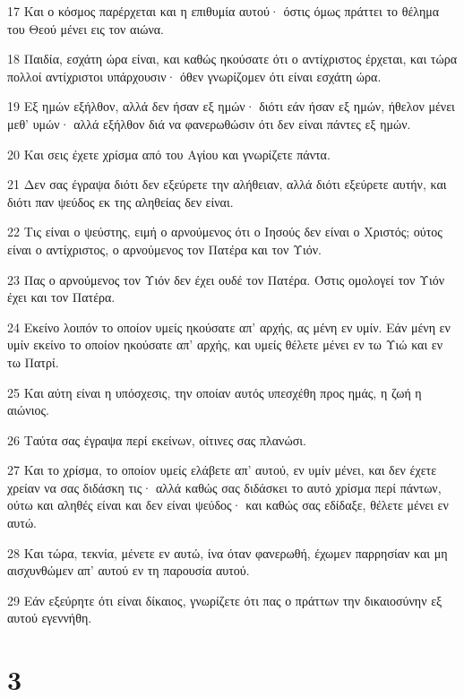 \par 17 Και ο κόσμος παρέρχεται και η επιθυμία αυτού· όστις όμως πράττει το θέλημα του Θεού μένει εις τον αιώνα.
\par 18 Παιδία, εσχάτη ώρα είναι, και καθώς ηκούσατε ότι ο αντίχριστος έρχεται, και τώρα πολλοί αντίχριστοι υπάρχουσιν· όθεν γνωρίζομεν ότι είναι εσχάτη ώρα.
\par 19 Εξ ημών εξήλθον, αλλά δεν ήσαν εξ ημών· διότι εάν ήσαν εξ ημών, ήθελον μένει μεθ' υμών· αλλά εξήλθον διά να φανερωθώσιν ότι δεν είναι πάντες εξ ημών.
\par 20 Και σεις έχετε χρίσμα από του Αγίου και γνωρίζετε πάντα.
\par 21 Δεν σας έγραψα διότι δεν εξεύρετε την αλήθειαν, αλλά διότι εξεύρετε αυτήν, και διότι παν ψεύδος εκ της αληθείας δεν είναι.
\par 22 Τις είναι ο ψεύστης, ειμή ο αρνούμενος ότι ο Ιησούς δεν είναι ο Χριστός; ούτος είναι ο αντίχριστος, ο αρνούμενος τον Πατέρα και τον Υιόν.
\par 23 Πας ο αρνούμενος τον Υιόν δεν έχει ουδέ τον Πατέρα. Όστις ομολογεί τον Υιόν έχει και τον Πατέρα.
\par 24 Εκείνο λοιπόν το οποίον υμείς ηκούσατε απ' αρχής, ας μένη εν υμίν. Εάν μένη εν υμίν εκείνο το οποίον ηκούσατε απ' αρχής, και υμείς θέλετε μένει εν τω Υιώ και εν τω Πατρί.
\par 25 Και αύτη είναι η υπόσχεσις, την οποίαν αυτός υπεσχέθη προς ημάς, η ζωή η αιώνιος.
\par 26 Ταύτα σας έγραψα περί εκείνων, οίτινες σας πλανώσι.
\par 27 Και το χρίσμα, το οποίον υμείς ελάβετε απ' αυτού, εν υμίν μένει, και δεν έχετε χρείαν να σας διδάσκη τις· αλλά καθώς σας διδάσκει το αυτό χρίσμα περί πάντων, ούτω και αληθές είναι και δεν είναι ψεύδος· και καθώς σας εδίδαξε, θέλετε μένει εν αυτώ.
\par 28 Και τώρα, τεκνία, μένετε εν αυτώ, ίνα όταν φανερωθή, έχωμεν παρρησίαν και μη αισχυνθώμεν απ' αυτού εν τη παρουσία αυτού.
\par 29 Εάν εξεύρητε ότι είναι δίκαιος, γνωρίζετε ότι πας ο πράττων την δικαιοσύνην εξ αυτού εγεννήθη.

\chapter{3}

